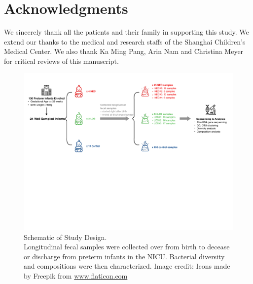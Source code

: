 \documentclass[fleqn,10pt]{wlpeerj} %
\begin{document}
\section*{Acknowledgments}
We sincerely thank all the patients and their family  in  supporting  this study. We extend our thanks to the medical and research staffs of the Shanghai Children’s Medical Center.  We also thank Ka Ming Pang, Arin Nam and Christina Meyer for critical reviews of this manuscript.



\begin{figure}[ht]
  \centering
  \includegraphics[width=\linewidth]{patinfo.pdf} %
  \caption{Schematic of Study Design. \\ Longitudinal fecal samples were collected over from birth to decease or discharge from preterm infants in the NICU. Bacterial diversity and compositions were then characterized. Image credit: Icons made by Freepik from \href{www.flaticon.com}{www.flaticon.com}}
  \label{fig:design}
\end{figure}
\end{document}
